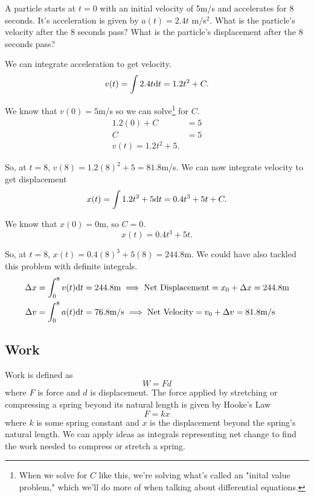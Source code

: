 \begin{example}
	A particle starts at $t=0$ with an initial velocity of 5m/s and accelerates for 8 seconds.
	It's acceleration is given by $a(t)=2.4t$ m/s$^2$.
	What is the particle's velocity after the 8 seconds pass?
	What is the particle's displacement after the 8 seconds pass?
\end{example}
\begin{answer}
	We can integrate acceleration to get velocity.
	\begin{equation*}
		v(t) = \int{2.4t\mathrm{d} t} = 1.2t^2 + C.
	\end{equation*}
	
	We know that $v(0)=5$m/s so we can solve\footnote{When we solve for $C$ like this, we're solving what's called an "inital value problem," which we'll do more of when talking about differential equations.} for $C$.
	\begin{align*}
		1.2(0) + C &= 5 \\
		C &= 5 \\
		v(t) = 1.2t^2 + 5.
	\end{align*}
	
	So, at $t=8$, $v(8) = 1.2(8)^2 + 5 = 81.8$m/s.
	We can now integrate velocity to get displacement
	\begin{equation*}
		x(t) = \int{1.2t^2 + 5 \mathrm{d} t} = 0.4t^3 + 5t + C.
	\end{equation*}
	
	We know that $x(0)=0$m, so $C=0$.
	\begin{equation*}
		x(t) = 0.4t^3 + 5t.
	\end{equation*}
	
	So, at $t=8$, $x(t) = 0.4(8)^3 + 5(8) = 244.8$m.
	We could have also tackled this problem with definite integrals.
	\begin{align*}
		\Delta x = \int_{0}^{8}{v(t)\mathrm{d} t} &= 244.8\text{m} \implies \text{Net Displacement} = x_0 + \Delta x = 244.8\text{m} \\
		\Delta v = \int_{0}^{8}{a(t)\mathrm{d} t} &= 76.8\text{m/s} \implies \text{Net Velocity} = v_0 + \Delta v = 81.8\text{m/s}
	\end{align*}
\end{answer}

\subsection{Work}
Work is defined as
\begin{equation*}
	W = Fd
\end{equation*}
where $F$ is force and $d$ is displacement.
The force applied by stretching or compressing a spring beyond its natural length is given by Hooke's Law
\begin{equation*}
	F = kx
\end{equation*}
where $k$ is some spring constant and $x$ is the displacement beyond the spring's natural length.
We can apply ideas as integrals representing net change to find the work needed to compress or stretch a spring.


